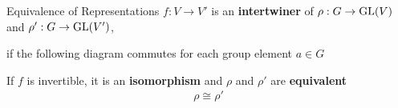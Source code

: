 \begin{frame}{Equivalence of Representations}
    \large
    $f: V \to V'$ is an \textbf{intertwiner} of $\rho: G \to \operatorname{GL}(V)$ and $\rho': G \to \operatorname{GL}(V')$,
    
    if the following diagram commutes for each group element $a \in G$
    
    \pause
    \begin{figure}[h]
        \centering
    \end{figure}
    
    \vspace*{1em}
    \pause
    If $f$ is invertible, it is an \textbf{isomorphism} and $\rho$ and $\rho'$ are \textbf{equivalent}
    \begin{align*}
        \rho \cong \rho'
    \end{align*}
    
    \normalsize
    {\hspace*{\fill} \cite{fuchs2003}}
\end{frame}
